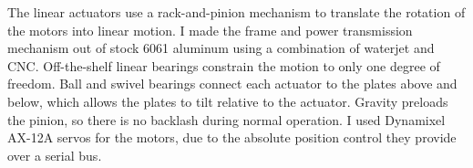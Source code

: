 The linear actuators use a rack-and-pinion mechanism to translate the rotation of the motors into linear motion. I made the frame and power transmission mechanism out of stock 6061 aluminum using a combination of waterjet and CNC. Off-the-shelf linear bearings constrain the motion to only one degree of freedom. Ball and swivel bearings connect each actuator to the plates above and below, which allows the plates to tilt relative to the actuator. Gravity preloads the pinion, so there is no backlash during normal operation. I used Dynamixel AX-12A servos for the motors, due to the absolute position control they provide over a serial bus. 



